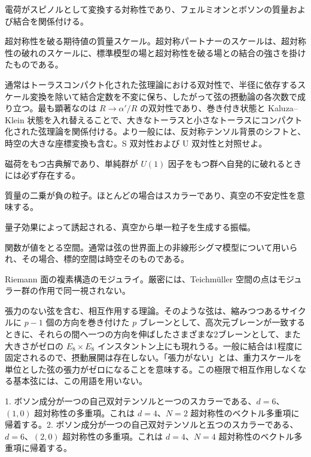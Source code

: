 {電荷がスピノルとして変換する対称性であり、フェルミオンとボソンの質量および結合を関係付ける。}

{超対称性を破る期待値の質量スケール。超対称パートナーのスケールは、超対称性の破れのスケールに、標準模型の場と超対称性を破る場との結合の強さを掛けたものである。}

{通常はトーラスコンパクト化された弦理論における双対性で、半径に依存するスケール変換を除いて結合定数を不変に保ち、したがって弦の摂動論の各次数で成り立つ。最も顕著なのは $R\to\alpha'/R$ の双対性であり、巻き付き状態と Kaluza--Klein 状態を入れ替えることで、大きなトーラスと小さなトーラスにコンパクト化された弦理論を関係付ける。より一般には、反対称テンソル背景のシフトと、時空の大きな座標変換も含む。S 双対性および U 双対性と対照せよ。}

{磁荷をもつ古典解であり、単純群が $U(1)$ 因子をもつ群へ自発的に破れるときには必ず存在する。}

{質量の二乗が負の粒子。ほとんどの場合はスカラーであり、真空の不安定性を意味する。}

{量子効果によって誘起される、真空から単一粒子を生成する振幅。}

{関数が値をとる空間。通常は弦の世界面上の非線形シグマ模型について用いられ、その場合、標的空間は時空そのものである。}

{Riemann 面の複素構造のモジュライ。厳密には、Teichmüller 空間の点はモジュラー群の作用で同一視されない。}

{張力のない弦を含む、相互作用する理論。そのような弦は、縮みつつあるサイクルに $p-1$ 個の方向を巻き付けた $p$ ブレーンとして、高次元ブレーンが一致するときに、それらの間へ一つの方向を伸ばしたさまざまな2ブレーンとして、また大きさがゼロの $E_8\times E_8$ インスタントン上にも現れうる。一般に結合は1程度に固定されるので、摂動展開は存在しない。「張力がない」とは、重力スケールを単位とした弦の張力がゼロになることを意味する。この極限で相互作用しなくなる基本弦には、この用語を用いない。}

{1. ボソン成分が一つの自己双対テンソルと一つのスカラーである、$d=6$、$(1,0)$ 超対称性の多重項。これは $d=4$、$N=2$ 超対称性のベクトル多重項に帰着する。2. ボソン成分が一つの自己双対テンソルと五つのスカラーである、$d=6$、$(2,0)$ 超対称性の多重項。これは $d=4$、$N=4$ 超対称性のベクトル多重項に帰着する。}

